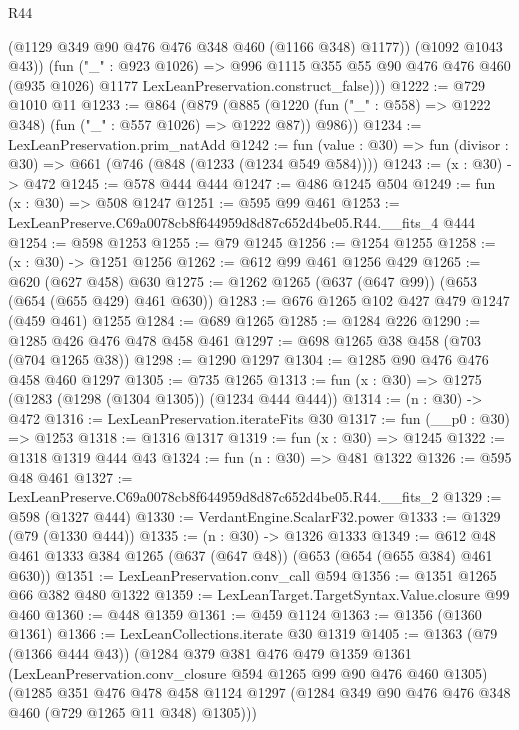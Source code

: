 \begin{lexlean}{R44}
\begin{coremodule}
            (@1129 @349 @90 @476 @476 @348 @460 (@1166 @348) @1177))
          (@1092 @1043 @43))
        (fun ("_" : @923 @1026) =>
        @996
          @1115
          @355
          @55
          @90
          @476
          @476
          @460
          (@935 @1026)
          @1177
          LexLeanPreservation.construct_false)))
@1222 := @729 @1010 @11
@1233 := @864
    (@879
      (@885 (@1220 (fun ("_" : @558) => @1222 @348) (fun ("_" : @557 @1026) => @1222 @87)) @986))
@1234 := LexLeanPreservation.prim_natAdd
@1242 := fun (value : @30) => fun (divisor : @30) => @661 (@746 (@848 (@1233 (@1234 @549 @584))))
@1243 := (x : @30) -> @472
@1245 := @578 @444 @444
@1247 := @486 @1245 @504
@1249 := fun (x : @30) => @508 @1247
@1251 := @595 @99 @461
@1253 := LexLeanPreserve.C69a0078cb8f644959d8d87c652d4be05.R44.__fits_4 @444
@1254 := @598 @1253
@1255 := @79 @1245
@1256 := @1254 @1255
@1258 := (x : @30) -> @1251 @1256
@1262 := @612 @99 @461 @1256 @429
@1265 := @620 (@627 @458) @630
@1275 := @1262 @1265 (@637 (@647 @99)) (@653 (@654 (@655 @429) @461 @630))
@1283 := @676 @1265 @102 @427 @479 @1247 (@459 @461) @1255
@1284 := @689 @1265
@1285 := @1284 @226
@1290 := @1285 @426 @476 @478 @458 @461
@1297 := @698 @1265 @38 @458 (@703 (@704 @1265 @38))
@1298 := @1290 @1297
@1304 := @1285 @90 @476 @476 @458 @460 @1297
@1305 := @735 @1265
@1313 := fun (x : @30) => @1275 (@1283 (@1298 (@1304 @1305)) (@1234 @444 @444))
@1314 := (n : @30) -> @472
@1316 := LexLeanPreservation.iterateFits @30
@1317 := fun (__p0 : @30) => @1253
@1318 := @1316 @1317
@1319 := fun (x : @30) => @1245
@1322 := @1318 @1319 @444 @43
@1324 := fun (n : @30) => @481 @1322
@1326 := @595 @48 @461
@1327 := LexLeanPreserve.C69a0078cb8f644959d8d87c652d4be05.R44.__fits_2
@1329 := @598 (@1327 @444)
@1330 := VerdantEngine.ScalarF32.power
@1333 := @1329 (@79 (@1330 @444))
@1335 := (n : @30) -> @1326 @1333
@1349 := @612 @48 @461 @1333 @384 @1265 (@637 (@647 @48)) (@653 (@654 (@655 @384) @461 @630))
@1351 := LexLeanPreservation.conv_call @594
@1356 := @1351 @1265 @66 @382 @480 @1322
@1359 := LexLeanTarget.TargetSyntax.Value.closure @99 @460
@1360 := @448 @1359
@1361 := @459 @1124
@1363 := @1356 (@1360 @1361)
@1366 := LexLeanCollections.iterate @30 @1319
@1405 := @1363
    (@79 (@1366 @444 @43))
    (@1284
      @379
      @381
      @476
      @479
      @1359
      @1361
      (LexLeanPreservation.conv_closure @594 @1265 @99 @90 @476 @460 @1305)
      (@1285
        @351
        @476
        @478
        @458
        @1124
        @1297
        (@1284 @349 @90 @476 @476 @348 @460 (@729 @1265 @11 @348) @1305)))

\end{coremodule}
\end{lexlean}
